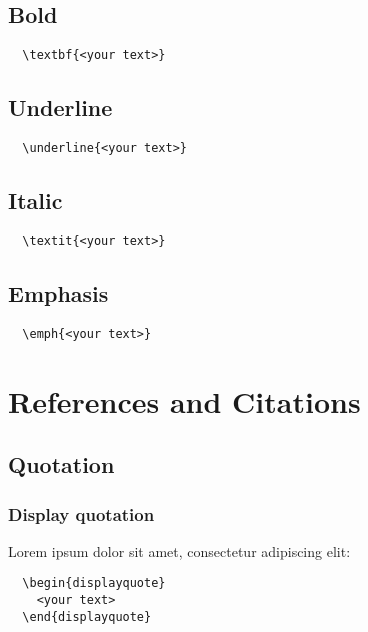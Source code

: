 \subsection{Bold}
\begin{lstlisting}
  \textbf{<your text>}
\end{lstlisting}

\subsection{Underline}
\begin{lstlisting}
  \underline{<your text>}
\end{lstlisting}

\subsection{Italic}
\begin{lstlisting}
  \textit{<your text>}
\end{lstlisting}

\subsection{Emphasis}
\begin{lstlisting}
  \emph{<your text>}
\end{lstlisting}

\section{References and Citations}

\subsection{Quotation}

\subsubsection{Display quotation}

Lorem ipsum dolor sit amet, consectetur adipiscing elit:
 
\begin{displayquote}
  \blindtext
\end{displayquote}

\begin{lstlisting}
  \begin{displayquote}
    <your text>
  \end{displayquote}
\end{lstlisting}

